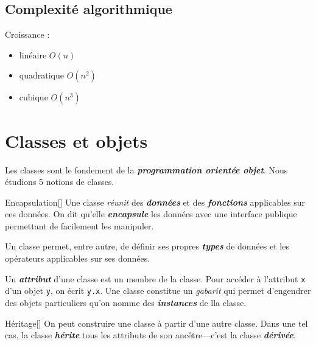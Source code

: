 \documentclass[10pt, french]{article}
\begin{document}
\begin{multicols*}{2}
\columnbreak
\subsection{Complexité algorithmique}
Croissance :
\begin{itemize}
	\item	linéaire $O(n)$
	\item	quadratique $O(n^{2})$
	\item	cubique $O(n^{3})$
\end{itemize}



\newpage	
\section{Classes et objets}
\begin{rappel_enhanced}[Contexte]
Les classes sont le fondement de la \textbf{\textit{programmation orientée objet}}. Nous étudions 5 notions de classes.
\end{rappel_enhanced}

\begin{definitionGENERAL}{Encapsulation}[]
Une classe \textit{réunit} des \textbf{\textit{données}} et des \textbf{\textit{fonctions}} applicables sur ces données. On dit qu'elle \textbf{\textit{encapsule}} les données avec une interface publique permettant de facilement les manipuler. 

\bigskip

Un classe permet, entre autre, de définir ses propres \textbf{\textit{types}} de données et les opérateurs applicables sur ses données.
\end{definitionGENERAL}

\begin{definitionNOHFILL}
Un \textbf{\textit{attribut}} d'une classe est un membre de la classe. Pour accéder à l'attribut \texttt{x} d'un objet \texttt{y}, on écrit \texttt{y.x}. Une classe constitue un \textit{gabarit} qui permet d'engendrer des objets particuliers qu'on nomme des \textbf{\textit{instances}} de lla classe.
\end{definitionNOHFILL}


\begin{definitionGENERAL}{Héritage}[]
On peut construire une classe à partir d'une autre classe. Dans une tel cas, la classe \textbf{\textit{hérite}} tous les attributs de son ancêtre---c'est la classe \textbf{\textit{dérivée}}.


\end{definitionGENERAL}
\end{multicols*}
\end{document}
